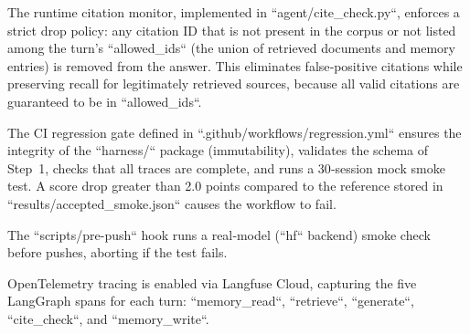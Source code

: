 
The runtime citation monitor, implemented in ``agent/cite_check.py``, enforces a strict drop policy: any citation ID that is not present in the corpus or not listed among the turn's ``allowed_ids`` (the union of retrieved documents and memory entries) is removed from the answer. This eliminates false‑positive citations while preserving recall for legitimately retrieved sources, because all valid citations are guaranteed to be in ``allowed_ids``.

The CI regression gate defined in ``.github/workflows/regression.yml`` ensures the integrity of the ``harness/`` package (immutability), validates the schema of Step 1, checks that all traces are complete, and runs a 30‑session mock smoke test. A score drop greater than 2.0 points compared to the reference stored in ``results/accepted_smoke.json`` causes the workflow to fail.

The ``scripts/pre-push`` hook runs a real‑model (``hf`` backend) smoke check before pushes, aborting if the test fails.

OpenTelemetry tracing is enabled via Langfuse Cloud, capturing the five LangGraph spans for each turn: ``memory_read``, ``retrieve``, ``generate``, ``cite_check``, and ``memory_write``.
